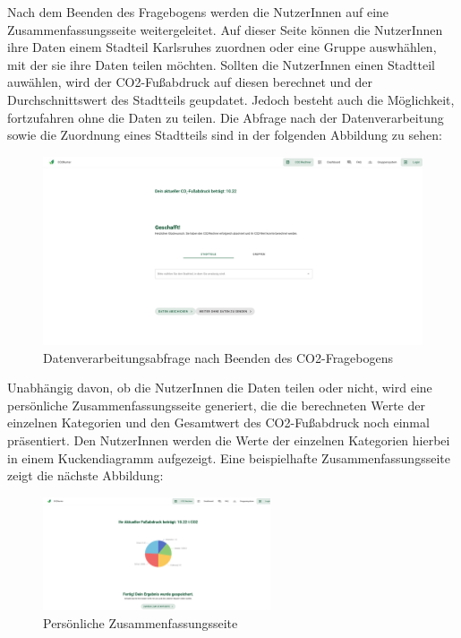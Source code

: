 Nach dem Beenden des Fragebogens werden die NutzerInnen auf eine Zusammenfassungsseite weitergeleitet.
Auf dieser Seite können die NutzerInnen ihre Daten einem Stadteil Karlsruhes zuordnen oder eine Gruppe auswhählen, mit der sie ihre Daten teilen möchten.
Sollten die NutzerInnen einen Stadtteil auwählen, wird der CO2-Fußabdruck auf diesen berechnet und der Durchschnittswert des Stadtteils geupdatet.
Jedoch besteht auch die Möglichkeit, fortzufahren ohne die Daten zu teilen.
Die Abfrage nach der Datenverarbeitung sowie die Zuordnung eines Stadtteils sind in der folgenden Abbildung zu sehen:
\begin{figure}[H]
    \centering
    \includegraphics[width=1\textwidth]{images/06/daten-verarbeitungs-seite.png}
    \caption{Datenverarbeitungsabfrage nach Beenden des CO2-Fragebogens}
    \label{fig:datenverarbeitungs-seite}
\end{figure}

Unabhängig davon, ob die NutzerInnen die Daten teilen oder nicht, wird eine persönliche Zusammenfassungsseite generiert, die die berechneten Werte der einzelnen Kategorien und den Gesamtwert des CO2-Fußabdruck noch einmal präsentiert.
Den NutzerInnen werden die Werte der einzelnen Kategorien hierbei in einem Kuckendiagramm aufgezeigt.
Eine beispielhafte Zusammenfassungsseite zeigt die nächste Abbildung:

\begin{figure}[H]
    \centering
    \includegraphics[width=0.6\textwidth]{images/06/persoenliche-zusammenfassung.png}
    \caption{Persönliche Zusammenfassungsseite}
    \label{fig:persnöliche-zusammenfassungs}
\end{figure}

